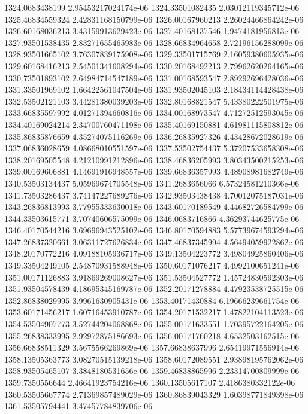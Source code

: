 {1324.0683438199 2.95453217024174e-06
1324.33501082435 2.03012119345712e-06
1325.46834559324 2.42831168150799e-06
1326.00167960213 2.26024466864242e-06
1326.60168036213 3.43159913629423e-06
1327.40168137546 1.9474181956813e-06
1327.93501538435 2.83271655465983e-06
1328.66834964658 2.72196156288099e-06
1328.93501665102 3.76307839175908e-06
1329.33501715769 2.16059380605935e-06
1329.60168416213 2.54501341608294e-06
1330.20168492213 2.79962620264165e-06
1330.73501893102 2.64984714547189e-06
1331.00168593547 2.89292696428036e-06
1331.33501969102 1.66422561047504e-06
1331.93502045103 2.18434114428438e-06
1332.53502121103 3.44281380039203e-06
1332.80168821547 5.43380222501975e-06
1333.66835597992 4.01271394660816e-06
1334.00168973547 4.71272512593045e-06
1334.40169024214 2.34700760471198e-06
1335.40169150881 4.61981115808812e-06
1335.86835876659 4.35274075116269e-06
1336.26835927326 4.43428672028619e-06
1337.06836028659 4.08668010551597e-06
1337.53502754437 5.37207533658308e-06
1338.20169505548 4.21210991212896e-06
1338.46836205993 3.80343500215253e-06
1339.00169606881 4.14691916948557e-06
1339.66836357993 4.48908981682749e-06
1340.53503134437 5.05969674705548e-06
1341.2683656066 6.57324581210366e-06
1341.73503286437 3.74147227689276e-06
1342.93503438438 4.70012075187031e-06
1343.26836813993 3.77955333630018e-06
1343.60170189549 4.44682726584799e-06
1344.33503615771 3.70740606575099e-06
1346.0683716866 4.36293744625775e-06
1346.40170544216 3.69696943525102e-06
1346.80170594883 5.57739674593294e-06
1347.26837320661 3.06311727626834e-06
1347.46837345994 4.56494059922862e-06
1348.20170772216 4.09188105936717e-06
1349.13504223772 3.49804925860406e-06
1349.33504249105 2.54870931588948e-06
1350.60171076217 4.4992100651241e-06
1351.00171126883 3.91869269008627e-06
1351.53504527772 1.45724830592303e-06
1351.93504578439 4.18695345169787e-06
1352.20171278884 4.47923538725515e-06
1352.86838029995 3.9961630905431e-06
1353.40171430884 6.19666239661754e-06
1353.60171456217 1.60716453910787e-06
1354.20171532217 1.47822104113523e-06
1354.53504907773 3.52744204068868e-06
1355.00171633551 1.70395722164205e-06
1355.26838333995 2.92972875186693e-06
1356.00171760218 4.6532503162515e-06
1356.66838511329 3.5675566269869e-06
1357.66838637996 2.65419971556914e-06
1358.13505363773 3.08270515139218e-06
1358.60172089551 2.93898195762062e-06
1358.93505465107 3.3848180531656e-06
1359.46838865996 2.23314700809999e-06
1359.7350556644 2.46641923754216e-06
1360.13505617107 2.4186380332122e-06
1360.53505667774 2.71369857489029e-06
1360.86839043329 1.60398771849398e-06
1361.53505794441 3.47457784839706e-06
}
